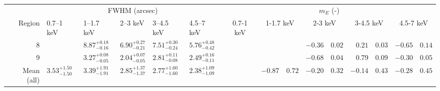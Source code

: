 \begin{tabular}{@{}rlllllr@{ $\pm$ }lr@{ $\pm$ }lr@{ $\pm$ }lr@{ $\pm$ }lr@{ $\pm$ }l@{}}
\cmidrule(l){2-16}
{} & \multicolumn{5}{c}{FWHM (arcsec)} & \multicolumn{10}{c}{$m_E$ (-)} \\
\cmidrule(l){2-6} \cmidrule(l){7-16}
Region & 0.7--1 keV & 1--1.7 keV & 2--3 keV & 3--4.5 keV & 4.5--7 keV
& \multicolumn{2}{c}{0.7-1 keV} & \multicolumn{2}{c}{1-1.7 keV}
& \multicolumn{2}{c}{2-3 keV} & \multicolumn{2}{c}{3-4.5 keV}
& \multicolumn{2}{c}{4.5-7 keV}\\
\midrule
8 & {} & ${8.87}^{+0.18}_{-0.16}$ & ${6.90}^{+0.27}_{-0.21}$ & ${7.51}^{+0.30}_{-0.24}$ & ${5.76}^{+0.48}_{-0.42}$
  & \multicolumn{4}{c}{} & $-0.36$ & $0.02$ & $0.21$ & $0.03$ & $-0.65$ & $0.14$\\
9 & {} & ${3.27}^{+0.08}_{-0.05}$ & ${2.04}^{+0.07}_{-0.05}$ & ${2.81}^{+0.11}_{-0.08}$ & ${2.49}^{+0.16}_{-0.11}$
  & \multicolumn{4}{c}{} & $-0.68$ & $0.04$ & $0.79$ & $0.09$ & $-0.30$ & $0.05$\\
\midrule
Mean (all) & ${3.53}^{+1.50}_{-1.50}$ & ${3.39}^{+1.91}_{-1.91}$ & ${2.85}^{+1.37}_{-1.37}$ & ${2.77}^{+1.60}_{-1.60}$ & ${2.38}^{+1.09}_{-1.09}$
           & \multicolumn{2}{c}{} & $-0.87$ & $0.72$ & $-0.20$ & $0.32$ & $-0.14$ & $0.43$ & $-0.28$ & $0.45$\\
\bottomrule
\end{tabular}
